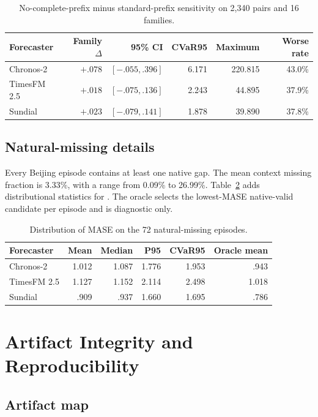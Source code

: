 \begin{table}[h]
\caption{No-complete-prefix minus standard-prefix sensitivity on 2,340 pairs and 16 families.}
\label{tab:prefix-sensitivity}
\centering
\small
\begin{tabular}{lrrrrr}
\toprule
Forecaster & Family $\Delta$ & 95\% CI & CVaR95 & Maximum & Worse rate \\
\midrule
Chronos-2 & $+.078$ & $[-.055,.396]$ & 6.171 & 220.815 & 43.0\% \\
TimesFM 2.5 & $+.018$ & $[-.075,.136]$ & 2.243 & 44.895 & 37.9\% \\
Sundial & $+.023$ & $[-.079,.141]$ & 1.878 & 39.890 & 37.8\% \\
\bottomrule
\end{tabular}
\end{table}

\subsection{Natural-missing details}

Every Beijing episode contains at least one native gap. The mean context missing fraction is 3.33\%, with a range from 0.09\% to 26.99\%. Table~\ref{tab:native-tail} adds distributional statistics for \bfais. The oracle selects the lowest-MASE native-valid candidate per episode and is diagnostic only.

\begin{table}[h]
\caption{Distribution of \bfais MASE on the 72 natural-missing episodes.}
\label{tab:native-tail}
\centering
\small
\begin{tabular}{lrrrrr}
\toprule
Forecaster & Mean & Median & P95 & CVaR95 & Oracle mean \\
\midrule
Chronos-2 & 1.012 & 1.087 & 1.776 & 1.953 & .943 \\
TimesFM 2.5 & 1.127 & 1.152 & 2.114 & 2.498 & 1.018 \\
Sundial & .909 & .937 & 1.660 & 1.695 & .786 \\
\bottomrule
\end{tabular}
\end{table}

\section{Artifact Integrity and Reproducibility}
\label{app:integrity}

\subsection{Artifact map}

